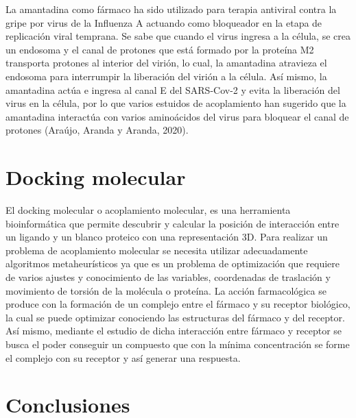 \documentclass[12pt]{article}
\begin{document}
La amantadina como fármaco ha sido utilizado para terapia antiviral contra la gripe por virus de la Influenza A actuando como bloqueador en la etapa de replicación viral temprana. Se sabe que cuando el virus ingresa a la célula, se crea un endosoma y el canal de protones que está formado por la proteína M2 transporta protones al interior del virión, lo cual, la amantadina atravieza el endosoma para interrumpir la liberación del virión a la célula. Así mismo, la amantadina actúa e ingresa al canal E del SARS-Cov-2 y evita la liberación del virus en la célula, por lo que varios estuidos de acoplamiento han sugerido que la amantadina interactúa con varios aminoácidos del virus para bloquear el canal de protones (Araújo, Aranda y Aranda, 2020).
	
	

	\section{Docking molecular }
	\label{sec:trab_relacionados}
	
El docking molecular o acoplamiento molecular, es una herramienta bioinformática que permite descubrir y calcular la posición de interacción entre un ligando y un blanco proteico con una representación 3D. Para realizar un problema de acoplamiento molecular se necesita utilizar adecuadamente algoritmos metaheurísticos ya que es un problema de optimización que requiere de varios ajustes y conocimiento de las variables, coordenadas de traslación y movimiento de torsión de la molécula o proteína. La acción farmacológica se produce con la formación de un  complejo  entre  el  fármaco  y  su  receptor  biológico, la cual se  puede optimizar  conociendo  las  estructuras  del  fármaco  y  del  receptor. Así mismo, mediante el  estudio  de dicha interacción entre fármaco y receptor se busca el poder conseguir un compuesto que con la mínima concentración  se forme el   complejo  con  su  receptor  y así generar una respuesta. 



\section{Conclusiones}
\label{sec:conclusao}
	
\end{document}
